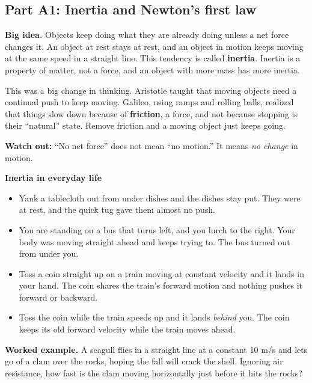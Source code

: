 \documentclass[
]{article}
\providecommand{\tightlist}{%
  \setlength{\itemsep}{0pt}\setlength{\parskip}{0pt}}
\begin{document}
\subsection{Part A1: Inertia and Newton's first
law}\label{part-a1-inertia-and-newtons-first-law}

\textbf{Big idea.} Objects keep doing what they are already doing unless
a net force changes it. An object at rest stays at rest, and an object
in motion keeps moving at the same speed in a straight line. This
tendency is called \textbf{inertia}. Inertia is a property of matter,
not a force, and an object with more mass has more inertia.

This was a big change in thinking. Aristotle taught that moving objects
need a continual push to keep moving. Galileo, using ramps and rolling
balls, realized that things slow down because of \textbf{friction}, a
force, and not because stopping is their ``natural'' state. Remove
friction and a moving object just keeps going.

\textbf{Watch out:} ``No net force'' does not mean ``no motion.'' It
means \emph{no change} in motion.

\textbf{Inertia in everyday life}

\begin{itemize}
\tightlist
\item
  Yank a tablecloth out from under dishes and the dishes stay put. They
  were at rest, and the quick tug gave them almost no push.
\item
  You are standing on a bus that turns left, and you lurch to the right.
  Your body was moving straight ahead and keeps trying to. The bus
  turned out from under you.
\item
  Toss a coin straight up on a train moving at constant velocity and it
  lands in your hand. The coin shares the train's forward motion and
  nothing pushes it forward or backward.
\item
  Toss the coin while the train speeds up and it lands \emph{behind}
  you. The coin keeps its old forward velocity while the train moves
  ahead.
\end{itemize}

\textbf{Worked example.} A seagull flies in a straight line at a
constant 10 m/s and lets go of a clam over the rocks, hoping the fall
will crack the shell. Ignoring air resistance, how fast is the clam
moving horizontally just before it hits the rocks?
\end{document}
